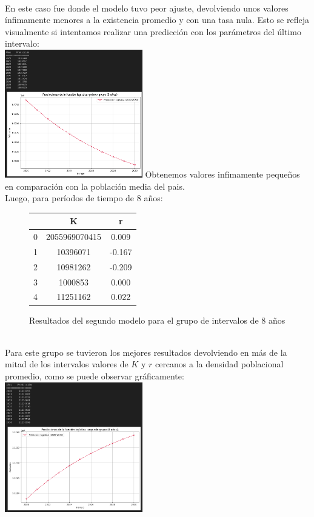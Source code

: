 \documentclass[a4paper,10pt,twocolumn]{article}
\begin{document}
\\
En este caso fue donde el modelo tuvo peor ajuste, devolviendo unos valores ínfimamente menores a la existencia promedio y con una tasa nula. Esto se refleja visualmente si intentamos realizar una predicción con los parámetros del último intervalo:\\
\includegraphics[width=0.45\textwidth]{img/df5_graph.png}
Obtenemos valores infimamente pequeños en comparación con la población media del pais.\\
Luego, para períodos de tiempo de 8 años:\\
\begin{figure}[h!]%
	\begin{center}
		\begin{tabular}{|c|c|c|} \hline
					 & K 			& r 		\\ \hline
			0		 & 2055969070415& 0.009		\\ \hline
			1		 & 10396071	    & -0.167	\\ \hline
			2		 & 10981262	    & -0.209	\\ \hline
			3		 & 1000853	    & 0.000		\\ \hline
			4		 & 11251162	    & 0.022		\\ \hline
		\end{tabular}
	\caption{Resultados del segundo modelo para el grupo de intervalos de 8 años \label{fig:ex}}
	\end{center}
\end{figure}
\\
Para este grupo se tuvieron los mejores resultados devolviendo en más de la mitad de los intervalos valores de $K$ y $r$ cercanos a la densidad poblacional promedio, como se puede observar gráficamente:
\includegraphics[width=0.45\textwidth]{img/df8_graph.png}
\end{document}
